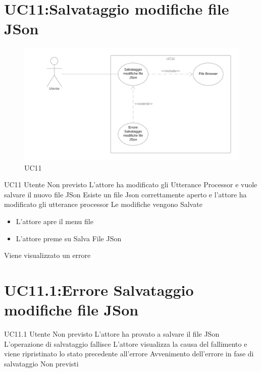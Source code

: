 \documentclass[../AnalisideiRequisiti.tex]{subfiles}
\begin{document}
\section{UC11:Salvataggio modifiche file JSon}
\begin{figure}[H]
	\caption{UC11}
	\centering
	\includegraphics[width=\textwidth]{../img/UC11.png}
\end{figure}
\UserCase
{UC11}
{Utente}
{Non previsto}
{L'attore ha modificato gli Utterance Processor e vuole salvare il nuovo file JSon}
{Esiste un file Json correttamente aperto  e l'attore ha modificato gli utterance processor }
{Le modifiche vengono Salvate}
{
	\begin{itemize}
		\item{} L'attore apre il menu file 
		\item{} L'attore preme su Salva File JSon
	\end{itemize}
}
{Viene visualizzato un errore }
\section{UC11.1:Errore Salvataggio modifiche file JSon}
\UserCase
{UC11.1}
{Utente}
{Non previsto}
{L'attore ha provato a salvare il file JSon}
{L'operazione di salvataggio fallisce }
{L'attore visualizza la causa del fallimento e viene ripristinato lo stato precedente all'errore}
{Avvenimento dell'errore in fase di salvataggio}
{Non previsti}
\end{document}
